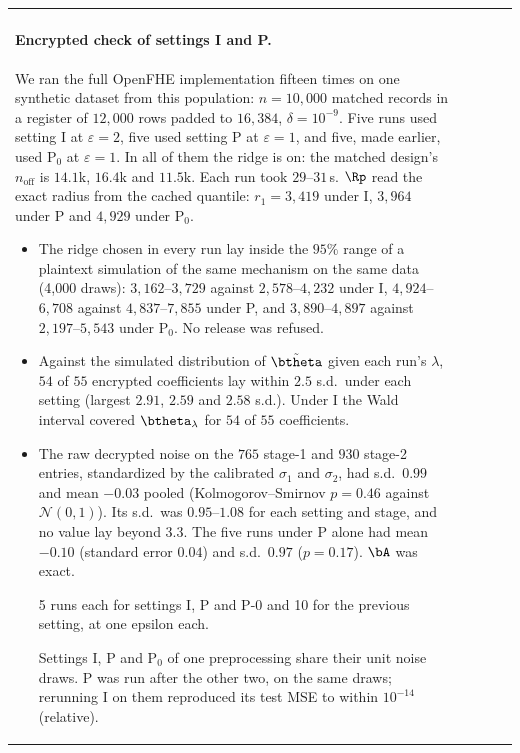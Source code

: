 \begin{tabular}{@{}lllll@{}}
\paragraph{Encrypted check of settings I and P.} We ran the full OpenFHE implementation fifteen times on one synthetic dataset from this population: $n = 10{,}000$ matched records in a register of $12{,}000$ rows padded to $16{,}384$, $\delta = 10^{-9}$. Five runs used setting I at $\varepsilon = 2$, five used setting P at $\varepsilon = 1$, and five, made earlier, used P$_0$ at $\varepsilon = 1$. In all of them the ridge is on: the matched design's $n_{\mathrm{off}}$ is $14.1$k, $16.4$k and $11.5$k. Each run took $29$--$31$\,s. $\Rp$ read the exact radius from the cached quantile: $r_1 = 3{,}419$ under I, $3{,}964$ under P and $4{,}929$ under P$_0$.
\begin{itemize}[noitemsep]
  \item The ridge chosen in every run lay inside the $95\%$ range of a plaintext simulation of the same mechanism on the same data (4{,}000 draws): $3{,}162$--$3{,}729$ against $2{,}578$--$4{,}232$ under I, $4{,}924$--$6{,}708$ against $4{,}837$--$7{,}855$ under P, and $3{,}890$--$4{,}897$ against $2{,}197$--$5{,}543$ under P$_0$. No release was refused.
  \item Against the simulated distribution of $\tilde\btheta$ given each run's $\lambda$, $54$ of $55$ encrypted coefficients lay within $2.5$ s.d.\ under each setting (largest $2.91$, $2.59$ and $2.58$ s.d.). Under I the Wald interval covered $\btheta_\lambda$ for $54$ of $55$ coefficients.
  \item The raw decrypted noise on the $765$ stage-1 and $930$ stage-2 entries, standardized by the calibrated $\sigma_1$ and $\sigma_2$, had s.d.\ $0.99$ and mean $-0.03$ pooled (Kolmogorov--Smirnov $p = 0.46$ against $\mathcal N(0, 1)$). Its s.d.\ was $0.95$--$1.08$ for each setting and stage, and no value lay beyond $3.3$. The five runs under P alone had mean $-0.10$ (standard error $0.04$) and s.d.\ $0.97$ ($p = 0.17$). $\bA$ was exact.

5 runs each for settings I, P and P-0 and 10 for the previous setting, at one epsilon each.

Settings I, P and P$_0$ of one preprocessing share their unit noise draws. P was run after the other two, on the same draws; rerunning I on them reproduced its test MSE to within $10^{-14}$ (relative).


\end{itemize}
\end{tabular}
